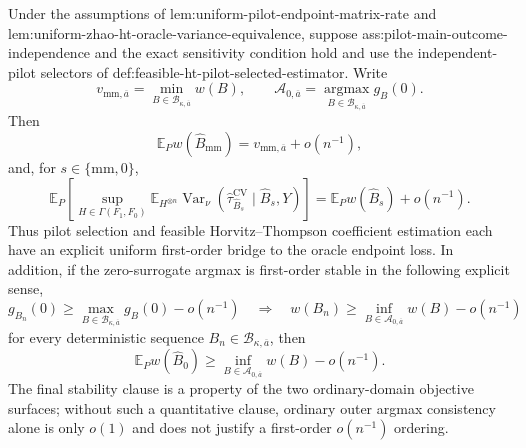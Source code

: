Under the assumptions of lem:uniform-pilot-endpoint-matrix-rate and lem:uniform-zhao-ht-oracle-variance-equivalence, suppose ass:pilot-main-outcome-independence and the exact sensitivity condition hold and use the independent-pilot selectors of def:feasible-ht-pilot-selected-estimator.  Write
\[
v_{\mathrm{mm},\overline a}=\min_{B\in\mathcal B_{\kappa,\overline a}}w(B),
\qquad
\mathcal A_{0,\overline a}=\operatorname*{argmax}_{B\in\mathcal B_{\kappa,\overline a}}g_B(0).
\]
Then
\[
\mathbb E_P w(\widehat B_{\mathrm{mm}})
=v_{\mathrm{mm},\overline a}+o(n^{-1}),
\]
and, for \(s\in\{\mathrm{mm},0\}\),
\[
\mathbb E_P\left[
\sup_{H\in\Gamma(F_1,F_0)}
\mathbb E_{H^{\otimes n}}
\operatorname{Var}_\nu
(\widehat\tau_{\widehat B_s}^{\mathrm{CV}}\mid\widehat B_s,Y)
\right]
=\mathbb E_Pw(\widehat B_s)+o(n^{-1}).
\]
Thus pilot selection and feasible Horvitz--Thompson coefficient estimation each have an explicit uniform first-order bridge to the oracle endpoint loss.  In addition, if the zero-surrogate argmax is first-order stable in the following explicit sense,
\[
g_{B_n}(0)\ge\max_{B\in\mathcal B_{\kappa,\overline a}}g_B(0)-o(n^{-1})
\quad\Longrightarrow\quad
w(B_n)\ge\inf_{B\in\mathcal A_{0,\overline a}}w(B)-o(n^{-1})
\]
for every deterministic sequence \(B_n\in\mathcal B_{\kappa,\overline a}\), then
\[
\mathbb E_Pw(\widehat B_0)
\ge\inf_{B\in\mathcal A_{0,\overline a}}w(B)-o(n^{-1}).
\]
The final stability clause is a property of the two ordinary-domain objective surfaces; without such a quantitative clause, ordinary outer argmax consistency alone is only \(o(1)\) and does not justify a first-order \(o(n^{-1})\) ordering.